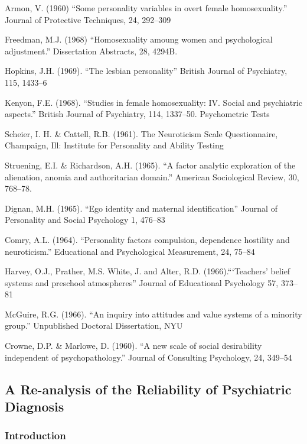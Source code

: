 \begin{refsection}
Armon, V. (1960) ``Some personality variables in overt female homosexuality.'' Journal of Protective Techniques, 24, 292--309

Freedman, M.J. (1968) ``Homosexuality amoung women and psychological adjustment.'' Dissertation Abstracts, 28, 4294B.

Hopkins, J.H. (1969). ``The lesbian personality'' British Journal of Psychiatry, 115, 1433--6

Kenyon, F.E. (1968). ``Studies in female homosexuality: IV. Social and psychiatric aspects.'' British Journal of Psychiatry, 114, 1337--50.
Psychometric Tests

Scheier, I. H. \& Cattell, R.B. (1961). The Neuroticism Scale Questionnaire, Champaign, Ill: Institute for Personality and Ability Testing

Struening, E.I. \& Richardson, A.H. (1965). ``A factor analytic exploration of the alienation, anomia and authoritarian domain.'' American Sociological Review, 30, 768--78.

Dignan, M.H. (1965). ``Ego identity and maternal identification'' Journal of Personality and Social Psychology 1, 476--83

Comry, A.L. (1964). ``Personality factors compulsion, dependence hostility and neuroticism.'' Educational and Psychological Measurement, 24, 75--84

Harvey, O.J., Prather, M.S. White, J. and Alter, R.D. (1966).```Teachers' belief systems and preschool atmospheres'' Journal of Educational Psychology 57, 373--81

McGuire, R.G. (1966). ``An inquiry into attitudes and value systems of a minority group.'' Unpublished Doctoral Dissertation, NYU

Crowne, D.P. \& Marlowe, D. (1960). ``A new scale of social desirability independent of psychopathology.'' Journal of Consulting Psychology, 24, 349--54

\newpage

\subsection{A Re-analysis of the Reliability of Psychiatric Diagnosis}
\label{are-analysisofthereliabilityofpsychiatricdiagnosis}

\subsubsection{Introduction}
\label{introduction}


\end{refsection}
